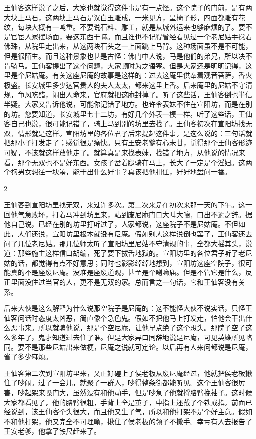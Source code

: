 王仙客这样说了之后，大家也就觉得这件事是有一点怪。这个院子的门前，是有两大块上马石，这两块上马石是汉白玉雕成，一米见方，呈椅子形，四面都雕有花纹，每块大概有一吨重。不要说石料、雕工，就是从城外运来也够麻烦的了。要不是官宦人家摆场面，要这东西干嘛。而且谁也不记得曾经看见过一个老尼姑手捻着佛珠，从院里走出来，从这两块石头之一上面跳上马背。这种场面虽不是不可能，但是很陌生。而且这种景象也甚是古怪：佛门中人说，马是他们的弟兄，所以决不肯骑马。王仙客提出了这个问题，大家顿时为之语塞。但是大家还是明明记得，这里是个尼姑庵。有关这座尼庵的故事是这样的：过去这庵里供奉着观音菩萨，香火极盛。长安城里多少达官贵人的夫人太太，都来这里上香。后来庵里的尼姑不守清规，争风吃醋，闹出人命来，官府就把这庵封掉了。听了这些话，王仙客倒也半信半疑。大家又告诉他说，可能你记错了地方。也许令表妹不住在宣阳坊，而是在别的坊。您要知道，长安城里七十二坊，有好几个外表一模一样。听了这些话，王仙客自己也说，很可能记错了，骑上马到别的坊里去找了。王仙客初次在宣阳坊找无双，情形就是这样。宣阳坊里的各位君子后来提起这件事，是这么说的：三句话就把那小子打发走了；感觉很是痛快。只有王安老爹有心未甘，觉得那个王仙客形迹可疑，不该就这样放他走了。就算真是来找表妹，找错了地方，从他说的情况来看，那个无双也不是好东西。女孩子岔着腿骑在马上，长大了一定是个淫妇。这两个狗男女想往一块凑，能干出什么好事？真该把他扣住，好好地盘问一番。 

2 

王仙客到宣阳坊里找无双，来过许多次。第二次来是在初次来那一天的下午。这一回他气急败坏，打着马冲到坊里来，站到废尼庵门口大叫大嚷，口出不逊之辞。据他自己说，已经在别的坊里打听过了，人家都说，这座院子不是尼姑庵。不但如此，人们还说，宣阳坊里根本就没有尼庵。假如别人这样说倒也罢了，王仙客还去问了几位老尼姑。那几位师太听了宣阳坊里尼姑不守清规的事，全都大摇其头，说道：那些施主这样信口胡编，死了要下拔舌地狱的。宣阳坊里的各位君子听了老尼姑的话，都觉得有点不好意思；同时也影影绰绰地想到，宣阳坊这座空院子，很可能真的不是座废尼庵。没准是座废道观，甚至是个喇嘛庙。但是不管它是什么，反正里面没住过当官的人，更不是无双的家。总而言之一句话，它和王仙客没有关系。 

后来大伙是这么解释为什么说那空院子是尼庵的：这不能怪大伙不说实话，只怪王仙客问话时态度太凶恶，简直像个急色鬼。假如不把他马上打发走，怕他会干出什么恶事来。所以就骗他说，那是个空尼庵，让他早点绝了这个想头。那院子空了这么多年了，鬼才知道过去住了谁。但是大家异口同辞地说是尼庵，可见英雄所见略同。要不是那些尼姑出来做梗，尼庵之说就可定论。以后再有人来问都说是尼庵，省了多少麻烦。 

王仙客第二次到宣阳坊里来，又正好碰上了侯老板从废尼庵经过，他就把侯老板揪住了吵闹。过了一会儿，就聚了一群人，吵得整条街都能听见。这个王仙客很厉害，吵起架来嗓门大，虽然没有和他动手，但是吵急了他就捋胳臂挽袖子。这时候大家都看见了，他的胳臂很粗，手背上全是茧子，中指上还戴了个铁戒指。前面已经说到，该王仙客个头很大，而且他又生了气，所以和他打架不是个好主意。假如不和他打架，他又完全不可理喻，揪住了侯老板的领子不撒手。幸亏有人去报告了王安老爹，他拿了铁尺赶来了。 

